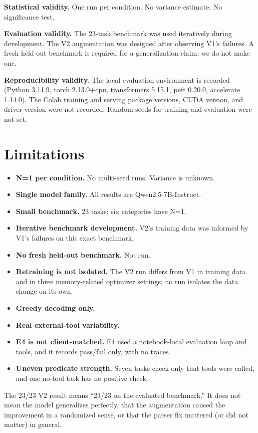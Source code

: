 \documentclass[10pt,twocolumn]{article}
\begin{document}
\textbf{Statistical validity.} One run per condition. No variance estimate. No significance test.

\textbf{Evaluation validity.} The 23-task benchmark was used iteratively during development. The V2 augmentation was designed after observing V1's failures. A fresh held-out benchmark is required for a generalization claim; we do not make one.

\textbf{Reproducibility validity.} The local evaluation environment is recorded (Python 3.11.9, torch 2.13.0+cpu, transformers 5.15.1, peft 0.20.0, accelerate 1.14.0). The Colab training and serving package versions, CUDA version, and driver version were not recorded. Random seeds for training and evaluation were not set.

\section{Limitations}

\begin{itemize}\itemsep2pt
\item \textbf{N=1 per condition.} No multi-seed runs. Variance is unknown.
\item \textbf{Single model family.} All results are Qwen2.5-7B-Instruct.
\item \textbf{Small benchmark.} 23 tasks; six categories have N=1.
\item \textbf{Iterative benchmark development.} V2's training data was informed by V1's failures on this exact benchmark.
\item \textbf{No fresh held-out benchmark.} Not run.
\item \textbf{Retraining is not isolated.} The V2 run differs from V1 in training data and in three memory-related optimizer settings; no run isolates the data change on its own.
\item \textbf{Greedy decoding only.}
\item \textbf{Real external-tool variability.}
\item \textbf{E4 is not client-matched.} E4 used a notebook-local evaluation loop and tools, and it records pass/fail only, with no traces.
\item \textbf{Uneven predicate strength.} Seven tasks check only that tools were called, and one no-tool task has no positive check.
\end{itemize}

The 23/23 V2 result means ``23/23 on the evaluated benchmark.'' It does not mean the model generalizes perfectly, that the augmentation caused the improvement in a randomized sense, or that the parser fix mattered (or did not matter) in general.
\end{document}

